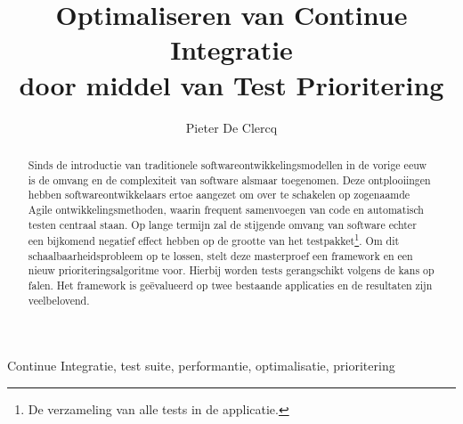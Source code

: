 \documentclass[10pt,twocolumn,twoside]{phdsymp-nl}
\begin{document}
	\title{Optimaliseren van Continue Integratie\\ door middel van Test Prioritering}
	\author{Pieter De Clercq}
	\maketitle
	
	\begin{abstract}
	Sinds de introductie van traditionele softwareontwikkelingsmodellen in de vorige eeuw is de omvang en de complexiteit van software alsmaar toegenomen. Deze ontplooiingen hebben softwareontwikkelaars ertoe aangezet om over te schakelen op zogenaamde Agile ontwikkelingsmethoden, waarin frequent samenvoegen van code en automatisch testen centraal staan. Op lange termijn zal de stijgende omvang van software echter een bijkomend negatief effect hebben op de grootte van het testpakket\footnote{De verzameling van alle tests in de applicatie.}. Om dit schaalbaarheidsprobleem op te lossen, stelt deze masterproef een framework en een nieuw prioriteringsalgoritme voor. Hierbij worden tests gerangschikt volgens de kans op falen. Het framework is ge\"evalueerd op twee bestaande applicaties en de resultaten zijn veelbelovend.
	\end{abstract}

	\begin{keywords}
		Continue Integratie, test suite, performantie, optimalisatie, prioritering
	\end{keywords}

	
	
	
	
	\clearpage
	
	
	
	
	
\end{document}
